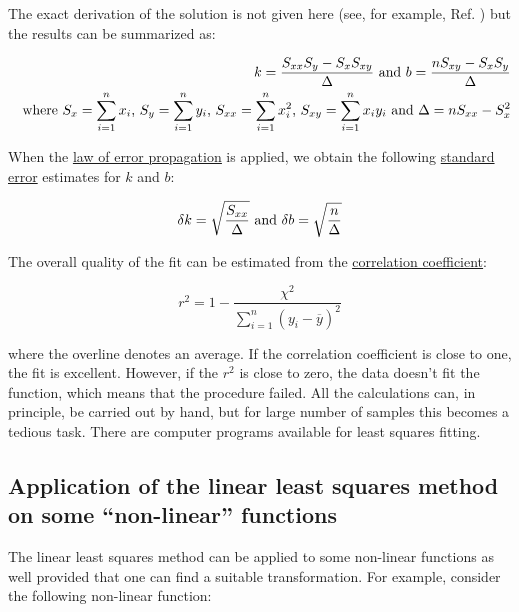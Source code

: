 \documentclass[byrevtex,amssymb,aps,pra,floatfix,letterpaper]{revtex4}
\begin{document}
The exact derivation of the solution is not given here (see, for example, Ref. \cite{NUMREP}) but the results can be summarized as:

\begin{eqnarray}
\label{eq17}
& & k = \frac{S_{xx}S_y - S_xS_{xy}}{\Delta}\textnormal{ and }b = \frac{nS_{xy}-S_xS_y}{\Delta}\\
\nonumber
& & \textnormal{where }S_x = \sum\limits_{i=1}^{n} x_i\textnormal{, }S_y = \sum\limits_{i=1}^{n} y_i\textnormal{, }S_{xx} = \sum\limits_{i=1}^{n} x_i^2\textnormal{, } S_{xy} = \sum\limits_{i=1}^{n} x_iy_i\textnormal{ and }\Delta = nS_{xx} - S_x^2
\end{eqnarray}

\noindent
When the \href{http://en.wikipedia.org/wiki/Error_propagation}{\underline{law of error propagation}} is applied, we obtain the following \href{http://en.wikipedia.org/wiki/Standard_error_\%28statistics\%29}{standard error} estimates for $k$ and $b$:

\begin{equation}
\label{eq18}
\delta k = \sqrt{\frac{S_{xx}}{\Delta}}\textnormal{ and }\delta b = \sqrt{\frac{n}{\Delta}}
\end{equation}

\noindent
The overall quality of the fit can be estimated from the \href{http://en.wikipedia.org/wiki/Coefficient_of_determination}{\underline{correlation coefficient}}:

\begin{equation}
\label{eq19}
r^2 = 1 - \frac{\chi^2}{\sum\limits_{i=1}^{n}\left(y_i - \overline{y}\right)^2}
\end{equation}

\noindent
where the overline denotes an average. If the correlation coefficient is close to one, the fit is
excellent. However, if the $r^2$ is close to zero, the data doesn’t fit the function, which means that the
procedure failed. All the calculations can, in principle, be carried out by hand, but for large
number of samples this becomes a tedious task. There are computer programs available for least
squares fitting.

\subsection{Application of the linear least squares method on some ``non-linear'' functions}

The linear least squares method can be applied to some non-linear functions as well provided that
one can find a suitable transformation. For example, consider the following non-linear function:
\end{document}
